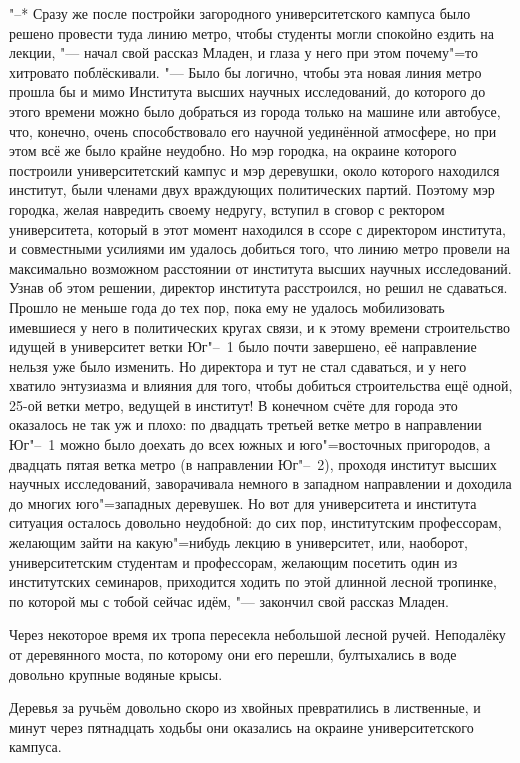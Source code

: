 "--* Сразу же после постройки загородного университетского кампуса было решено
провести туда линию метро, чтобы студенты могли спокойно ездить на лекции,
"--- начал свой рассказ Младен, и глаза у него при этом почему"=то хитровато
поблёскивали.
"--- Было бы логично, чтобы эта новая линия метро прошла бы и мимо Института
высших научных исследований, до которого до этого времени можно было добраться
из города только на машине или автобусе, что, конечно, очень способствовало его
научной уединённой атмосфере, но при этом всё же было крайне неудобно.
Но мэр городка, на окраине которого построили университетский кампус и мэр
деревушки, около которого находился институт, были членами двух враждующих
политических партий.
Поэтому мэр городка, желая навредить своему недругу, вступил в сговор с ректором
университета, который в этот момент находился в ссоре с директором института, и
совместными усилиями им удалось добиться того, что линию метро провели на
максимально возможном расстоянии от института высших научных исследований.
Узнав об этом решении, директор института расстроился, но решил не сдаваться.
Прошло не меньше года до тех пор, пока ему не удалось мобилизовать имевшиеся у
него в политических кругах связи, и к этому времени строительство идущей в
университет ветки Юг"--~1 было почти завершено, её направление нельзя уже было
изменить.
Но директора и тут не стал сдаваться, и у него хватило энтузиазма и влияния для
того, чтобы добиться строительства ещё одной, 25-ой ветки метро, ведущей в
институт!
В конечном счёте для города это оказалось не так уж и плохо: по двадцать третьей
ветке метро в направлении Юг"--~1 можно было доехать до всех южных и
юго"=восточных пригородов, а двадцать пятая ветка метро (в направлении Юг"--~2),
проходя институт высших научных исследований, заворачивала немного в западном
направлении и доходила до многих юго"=западных деревушек.
Но вот для университета и института ситуация осталось довольно неудобной: до сих
пор, институтским профессорам, желающим зайти на какую"=нибудь лекцию в
университет, или, наоборот, университетским студентам и профессорам, желающим
посетить один из институтских семинаров, приходится ходить по этой длинной
лесной тропинке, по которой мы с тобой сейчас идём, "--- закончил свой рассказ
Младен.

Через некоторое время их тропа пересекла небольшой лесной ручей.
Неподалёку от деревянного моста, по которому они его перешли, бултыхались в воде
довольно крупные водяные крысы.

Деревья за ручьём довольно скоро из хвойных превратились в лиственные, и минут
через пятнадцать ходьбы они оказались на окраине университетского кампуса.

